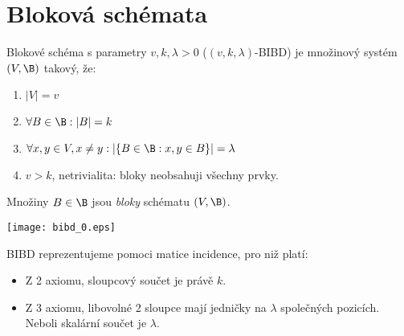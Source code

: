 \section{\texorpdfstring{Bloková schémata}{Bloková schémata}}
\vspace{5mm}
\large

\begin{definition}
	Blokové schéma s parametry $v, k, \lambda > 0$ ($(v, k, \lambda)$-BIBD) je množinový systém $(V, \B)$ takový, že:
	\begin{enumerate}
		\item $|V| = v$
		\item $\forall B \in \B: |B| = k$
		\item $\forall x, y \in V, x \ne y: |\{ B \in \B: x, y \in B \}| = \lambda$
		\item $v > k$, netrivialita: bloky neobsahuji všechny prvky.
	\end{enumerate}
	Množiny $B \in \B$ jsou \emph{bloky} schématu $(V, \B)$.
\end{definition}

\begin{properties}[BIBD]
	\texttt{[image: bibd\_0.eps]}

	BIBD reprezentujeme pomoci matice incidence, pro niž platí:
	\begin{itemize}
		\item Z 2 axiomu, sloupcový součet je právě $k$.
		\item Z 3 axiomu, libovolné 2 sloupce mají jedničky na $\lambda$ společných pozicích.
			Neboli skalární součet je $\lambda$.
	\end{itemize}
\end{properties}

